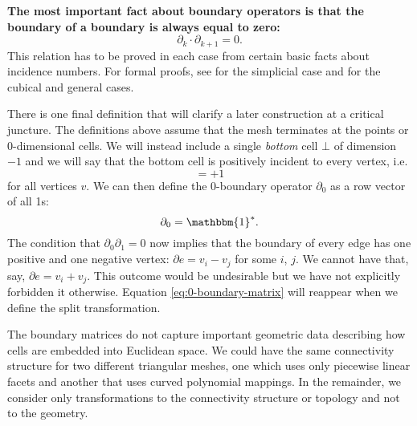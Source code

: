 \documentclass[twocolumn]{article}
\begin{document}
\textbf{The most important fact about boundary operators is that the boundary of a boundary is always equal to zero:}
\begin{equation}
    \partial_k\cdot\partial_{k + 1} = 0.
    \label{eq:ddzero}
\end{equation}
This relation has to be proved in each case from certain basic facts about incidence numbers.
For formal proofs, see \cite{hatcher2002algebraic} for the simplicial case and \cite{massey2019basic} for the cubical and general cases.

There is one final definition that will clarify a later construction at a critical juncture.
The definitions above assume that the mesh terminates at the points or 0-dimensional cells.
We will instead include a single \emph{bottom} cell $\bot$ of dimension $-1$ and we will say that the bottom cell is positively incident to every vertex, i.e.
\begin{equation}
    [v, \bot] = +1
\end{equation}
for all vertices $v$.
We can then define the 0-boundary operator $\partial_0$ as a row vector of all 1s:
\begin{equation}
    \partial_0 = \mathbbm{1}^*.
    \label{eq:0-boundary-matrix}
\end{equation}
The condition that $\partial_0\partial_1 = 0$ now implies that the boundary of every edge has one positive and one negative vertex: $\partial e = v_i - v_j$ for some $i$, $j$.
We cannot have that, say, $\partial e = v_i + v_j$.
This outcome would be undesirable but we have not explicitly forbidden it otherwise.
Equation \eqref{eq:0-boundary-matrix} will reappear when we define the split transformation.

The boundary matrices do not capture important geometric data describing how cells are embedded into Euclidean space.
We could have the same connectivity structure for two different triangular meshes, one which uses only piecewise linear facets and another that uses curved polynomial mappings.
In the remainder, we consider only transformations to the connectivity structure or topology and not to the geometry.
\end{document}
